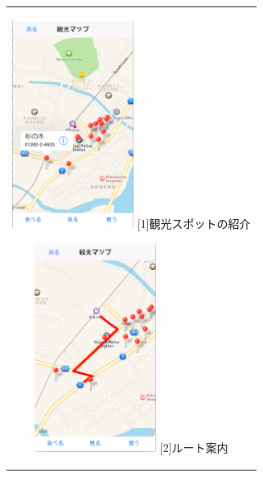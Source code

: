 \documentclass[openany,11pt,papersize]{jsbook}
\begin{document}


\begin{figure}[htbp]
  \begin{center}
    \begin{tabular}{c}

      \begin{minipage}{0.33\hsize}
        \begin{center}
\includegraphics[width=4cm, bb=0 0 322 550]{5.3_map1.png}
          \hspace{1cm} [1]観光スポットの紹介
        \end{center}
      \end{minipage}

      \begin{minipage}{0.33\hsize}
        \begin{center}
\includegraphics[width=4cm, bb=0 0 321 550]{5.3_map2.png}
          \hspace{1cm} [2]ルート案内
        \end{center}
      \end{minipage}


\end{tabular}
\end{center}
\end{figure}
\end{document}
